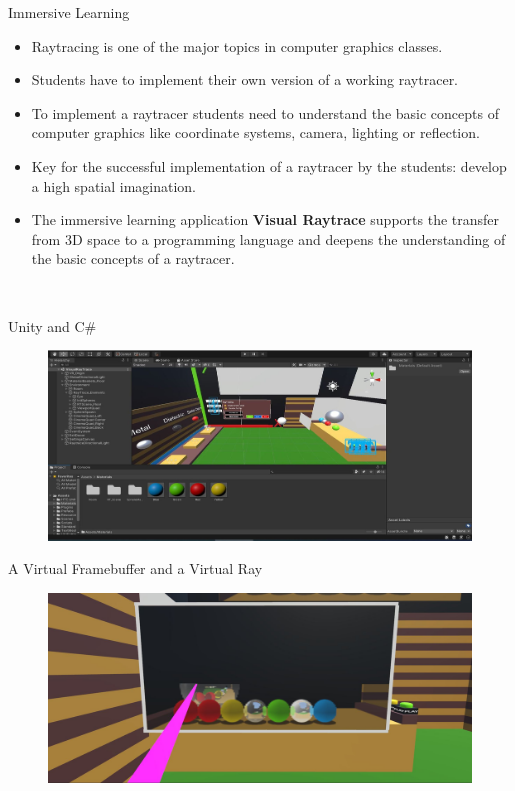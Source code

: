 \documentclass[final,hyperref={pdfpagelabels=false}]{beamer}
\begin{document}
\begin{frame}[t]
\begin{columns}[t]
\begin{column}{0.465\textwidth}
\begin{block}{Immersive Learning}
   \begin{itemize}
   \item Raytracing is one of the major topics in computer graphics classes.
   \item Students have to implement their own version of a working raytracer.
   \item To implement a raytracer students need to understand the basic concepts of computer graphics
   like coordinate systems, camera, lighting or reflection.
   \item Key for the successful implementation of a raytracer by the students: develop a high spatial imagination.
   \item The immersive learning application \textbf{Visual Raytrace} supports the transfer from 3D space
   to a programming language and deepens the understanding of the basic concepts of a raytracer.
       
       \vspace{1.55cm}$\:$
   \end{itemize}

\end{block}

\vspace*{2.0cm}

\begin{block}{Unity and C\#}
    \begin{figure}
    	\centering
        \includegraphics[width=0.95\linewidth]{unityIDE}
    \end{figure}
\end{block}

\begin{block}{A Virtual Framebuffer and a Virtual Ray}
    \begin{figure}
    	\centering
        \includegraphics[width=0.95\linewidth]{duringProcessEyeView}
    \end{figure}
\end{block}


\end{column}
\end{columns}
\end{frame}
\end{document}
